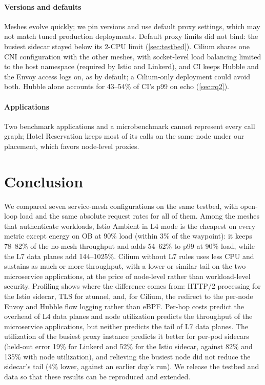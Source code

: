\paragraph{Versions and defaults}
Meshes evolve quickly; we pin versions and use default proxy settings, which
may not match tuned production deployments. Default proxy limits did not bind:
the busiest sidecar stayed below its 2-CPU limit (\cref{sec:testbed}).
Cilium shares one CNI configuration with the other meshes, with socket-level
load balancing limited to the host namespace (required by Istio and Linkerd),
and CI keeps Hubble and the Envoy access logs on, as by default; a Cilium-only
deployment could avoid both. Hubble alone accounts for 43--54\% of CI's p99 on
echo (\cref{sec:rq2}).

\paragraph{Applications}
Two benchmark applications and a microbenchmark cannot represent every call
graph; Hotel Reservation keeps most of its calls on the same node under our
placement, which favors node-level proxies.

\section{Conclusion}
\label{sec:conclusion}

We compared seven service-mesh configurations on the same testbed, with open-loop
load and the same absolute request rates for all of them. Among the meshes that
authenticate workloads, Istio Ambient in L4 mode is the cheapest on every
metric except energy on OB at 90\% load (within 3\% of the waypoint): it keeps 78--82\% of the no-mesh throughput and adds 54--62\% to p99 at
90\% load, while the L7 data planes add 144--1025\%. Cilium without L7 rules uses
less CPU and sustains as much or more throughput, with a lower or similar tail on the
two microservice applications, at the price of node-level rather than
workload-level security. Profiling shows where the difference comes
from: HTTP/2 processing for the Istio sidecar, TLS for ztunnel, and, for Cilium,
the redirect to the per-node Envoy and Hubble flow logging rather than eBPF.
Per-hop costs predict the overhead of L4 data planes and node utilization
predicts the throughput of the microservice applications, but neither predicts
the tail of L7 data planes. The utilization of the busiest proxy instance
predicts it better for per-pod sidecars (held-out error 19\% for Linkerd and
52\% for the Istio sidecar, against 82\% and 135\% with node utilization), and
relieving the busiest node did not reduce the sidecar's tail (4\% lower,
against an earlier day's run). We release the testbed and
data so that these results can be reproduced and extended.
